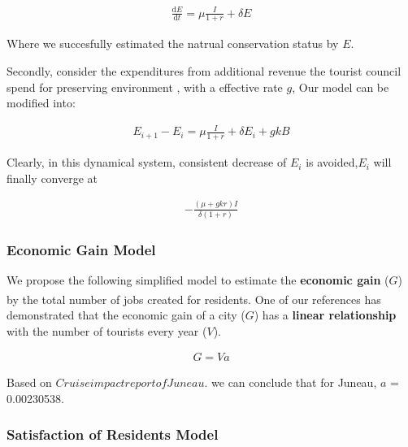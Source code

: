 \documentclass[UTF8]{mcmthesis}
\begin{document}
\begin{equation}
    \begin{aligned}
\frac{\text{d}E}{\text{d}t}  =  \mu \frac{I}{1+r}+\delta E 
    \end{aligned}
    \end{equation}

    Where we succesfully estimated the natrual conservation status by ${E}$.

Secondly, consider the expenditures from additional revenue the tourist council spend for preserving environment , with a effective rate ${g}$, Our model can be modified into:

\begin{equation}
    \begin{aligned}
{E_{i+1}} -E_{i} = \mu \frac{I}{1+r} + \delta {E_{i}} +gkB
    \end{aligned}
    \end{equation}

    Clearly, in this dynamical system, consistent decrease of {$E_i$} is avoided,{$E_i$}
   will finally converge at 

   \begin{align*}
    -\frac{(\mu  + gkr)I}{\delta(1+r)}
            \end{align*}


            \subsubsection{Economic Gain Model}

            \hspace*{2em} We propose the following simplified model to estimate the \textbf{economic gain} (\(G\)) by the total number of jobs created for residents. One of our references \textsuperscript{\cite{Xu}} has demonstrated that the economic gain of a city (\(G\)) has a \textbf{linear relationship} with the number of tourists every year (\(V\)).
            

    \begin{equation}
        \begin{aligned}
        G = Va
        \end{aligned}
        \end{equation}

        Based on ${Cruise impact report of Juneau}$. we can conclude that for Juneau, $a$ = 0.00230538.


        \subsubsection{Satisfaction of Residents Model}
\end{document}
